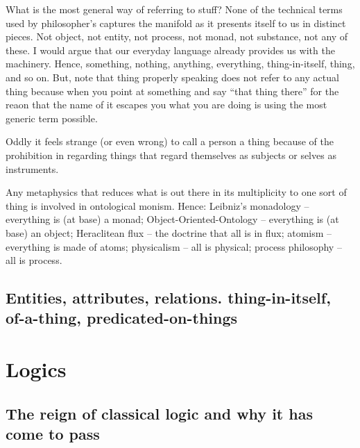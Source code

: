 \documentclass[dah,phd,a4paper]{xe_uccthesis}
\begin{document}
What is the most general way of referring to stuff? None of the technical
terms used by philosopher's captures the manifold as it presents itself
to us in distinct pieces. Not object, not entity, not process, not
monad, not substance, not any of these. I would argue that our everyday
language already provides us with the machinery. Hence, something,
nothing, anything, everything, thing-in-itself, thing, and so on.
But, note that thing properly speaking does not refer to any actual
thing because when you point at something and say ``that thing there''
for the reaon that the name of it escapes you what you are doing is
using the most generic term possible.

Oddly it feels strange (or even wrong) to call a person a thing because
of the prohibition in regarding things that regard themselves as subjects
or selves as instruments.

Any metaphysics that reduces what is out there in its multiplicity
to one sort of thing is involved in ontological monism. Hence: Leibniz's
monadology -- everything is (at base) a monad; Object-Oriented-Ontology
-- everything is (at base) an object; Heraclitean flux -- the doctrine
that all is in flux; atomism -- everything is made of atoms; physicalism
-- all is physical; process philosophy -- all is process. 

\subsection{Entities, attributes, relations. \texorpdfstring{thing\--in\--itself}{thing-in-itself}, \texorpdfstring{of\--a\--thing}{of-a-thing}, \texorpdfstring{predicated\--on\--things}{predicated-on-things}}

\lipsum[80]

\section{Logics}

\subsection{The reign of classical logic and why it has come to pass}

\lipsum[81]
\end{document}
